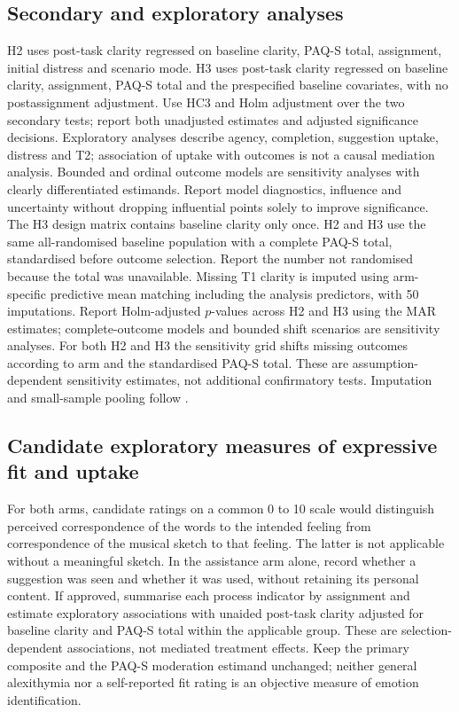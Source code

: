 \documentclass[11pt,a4paper]{article}
\begin{document}
\subsection{Secondary and exploratory analyses}
H2 uses post-task clarity regressed on baseline clarity, PAQ-S total, assignment, initial distress and scenario mode. H3 uses post-task clarity regressed on baseline clarity, assignment, PAQ-S total and the prespecified baseline covariates, with no postassignment adjustment. Use HC3 and Holm adjustment over the two secondary tests; report both unadjusted estimates and adjusted significance decisions. Exploratory analyses describe agency, completion, suggestion uptake, distress and T2; association of uptake with outcomes is not a causal mediation analysis. Bounded and ordinal outcome models are sensitivity analyses with clearly differentiated estimands. Report model diagnostics, influence and uncertainty without dropping influential points solely to improve significance. The H3 design matrix contains baseline clarity only once. H2 and H3 use the same all-randomised baseline population with a complete PAQ-S total, standardised before outcome selection. Report the number not randomised because the total was unavailable. Missing T1 clarity is imputed using arm-specific predictive mean matching including the analysis predictors, with 50 imputations. Report Holm-adjusted \(p\)-values across H2 and H3 using the MAR estimates; complete-outcome models and bounded shift scenarios are sensitivity analyses. For both H2 and H3 the sensitivity grid shifts missing outcomes according to arm and the standardised PAQ-S total. These are assumption-dependent sensitivity estimates, not additional confirmatory tests. Imputation and small-sample pooling follow \textcite{white2011,barnard1999}.

\subsection{Candidate exploratory measures of expressive fit and uptake}
For both arms, candidate ratings on a common 0 to 10 scale would distinguish perceived correspondence of the words to the intended feeling from correspondence of the musical sketch to that feeling. The latter is not applicable without a meaningful sketch. In the assistance arm alone, record whether a suggestion was seen and whether it was used, without retaining its personal content. If approved, summarise each process indicator by assignment and estimate exploratory associations with unaided post-task clarity adjusted for baseline clarity and PAQ-S total within the applicable group. These are selection-dependent associations, not mediated treatment effects. Keep the primary composite and the PAQ-S moderation estimand unchanged; neither general alexithymia nor a self-reported fit rating is an objective measure of emotion identification.
\end{document}
